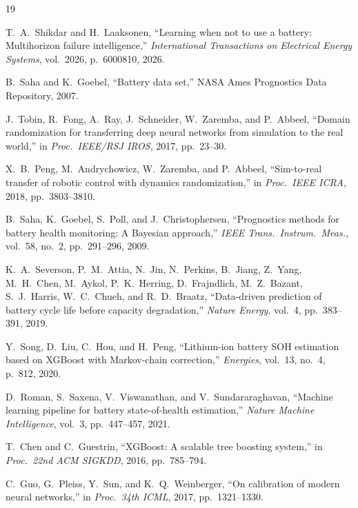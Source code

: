 \documentclass[11pt,a4paper]{article}
\begin{document}
\begin{thebibliography}{19}

T.~A.~Shikdar and H.~Laaksonen, ``Learning when not to use a battery: Multihorizon failure intelligence,'' \textit{International Transactions on Electrical Energy Systems}, vol.~2026, p.~6000810, 2026.

B.~Saha and K.~Goebel, ``Battery data set,'' NASA Ames Prognostics Data Repository, 2007.

J.~Tobin, R.~Fong, A.~Ray, J.~Schneider, W.~Zaremba, and P.~Abbeel, ``Domain randomization for transferring deep neural networks from simulation to the real world,'' in \textit{Proc.~IEEE/RSJ IROS}, 2017, pp.~23--30.

X.~B.~Peng, M.~Andrychowicz, W.~Zaremba, and P.~Abbeel, ``Sim-to-real transfer of robotic control with dynamics randomization,'' in \textit{Proc.~IEEE ICRA}, 2018, pp.~3803--3810.

B.~Saha, K.~Goebel, S.~Poll, and J.~Christophersen, ``Prognostics methods for battery health monitoring: A Bayesian approach,'' \textit{IEEE Trans.~Instrum.~Meas.}, vol.~58, no.~2, pp.~291--296, 2009.

K.~A.~Severson, P.~M.~Attia, N.~Jin, N.~Perkins, B.~Jiang, Z.~Yang, M.~H.~Chen, M.~Aykol, P.~K.~Herring, D.~Frajndlich, M.~Z.~Bazant, S.~J.~Harris, W.~C.~Chueh, and R.~D.~Braatz, ``Data-driven prediction of battery cycle life before capacity degradation,'' \textit{Nature Energy}, vol.~4, pp.~383--391, 2019.

Y.~Song, D.~Liu, C.~Hou, and H.~Peng, ``Lithium-ion battery SOH estimation based on XGBoost with Markov-chain correction,'' \textit{Energies}, vol.~13, no.~4, p.~812, 2020.

D.~Roman, S.~Saxena, V.~Viswanathan, and V.~Sundararaghavan, ``Machine learning pipeline for battery state-of-health estimation,'' \textit{Nature Machine Intelligence}, vol.~3, pp.~447--457, 2021.

T.~Chen and C.~Guestrin, ``XGBoost: A scalable tree boosting system,'' in \textit{Proc.~22nd ACM SIGKDD}, 2016, pp.~785--794.

C.~Guo, G.~Pleiss, Y.~Sun, and K.~Q.~Weinberger, ``On calibration of modern neural networks,'' in \textit{Proc.~34th ICML}, 2017, pp.~1321--1330.


\end{thebibliography}
\end{document}
